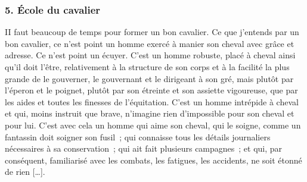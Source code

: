 \documentclass[french,twoside]{book} %
\begin{document}
\subsubsection[{5. École du cavalier}]{5. École du cavalier}
\noindent II faut beaucoup de temps pour former un bon cavalier. Ce que j’entends par un bon cavalier, ce n’est point un homme exercé à manier son cheval avec grâce et adresse. Ce n’est point un écuyer. C’est un homme robuste, placé à cheval ainsi qu’il doit l’être, relativement à la structure de son corps et à la facilité la plus grande de le gouverner, le gouvernant et le dirigeant à son gré, mais plutôt par l’éperon et le poignet, plutôt par son étreinte et son assiette vigoureuse, que par les aides et toutes les finesses de l’équitation. C’est un homme intrépide à cheval et qui, moins instruit que brave, n’imagine rien d’impossible pour son cheval et pour lui. C’est avec cela un homme qui aime son cheval, qui le soigne, comme un fantassin doit soigner son fusil ; qui connaisse tous les détails journaliers nécessaires à sa conservation ; qui ait fait plusieurs campagnes ; et qui, par conséquent, familiarisé avec les combats, les fatigues, les accidents, ne soit étonné de rien […].\par
\end{document}
